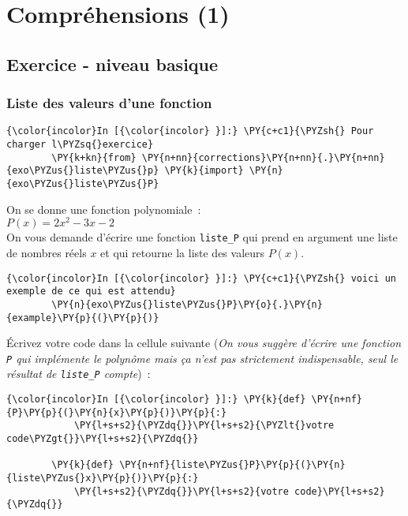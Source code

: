     \hypertarget{compruxe9hensions-1}{%
\section{Compréhensions (1)}\label{compruxe9hensions-1}}

    \hypertarget{exercice---niveau-basique}{%
\subsection{Exercice - niveau basique}\label{exercice---niveau-basique}}

    \hypertarget{liste-des-valeurs-dune-fonction}{%
\subsubsection{Liste des valeurs d'une
fonction}\label{liste-des-valeurs-dune-fonction}}

    \begin{Verbatim}[commandchars=\\\{\}]
{\color{incolor}In [{\color{incolor} }]:} \PY{c+c1}{\PYZsh{} Pour charger l\PYZsq{}exercice}
        \PY{k+kn}{from} \PY{n+nn}{corrections}\PY{n+nn}{.}\PY{n+nn}{exo\PYZus{}liste\PYZus{}p} \PY{k}{import} \PY{n}{exo\PYZus{}liste\PYZus{}P}
\end{Verbatim}


    On se donne une fonction polynomiale~:\\

\(P(x) = 2x^2 - 3x - 2\)\\

    On vous demande d'écrire une fonction \texttt{liste\_P} qui prend en
argument une liste de nombres réels \(x\) et qui retourne la liste des
valeurs \(P(x)\).

    \begin{Verbatim}[commandchars=\\\{\}]
{\color{incolor}In [{\color{incolor} }]:} \PY{c+c1}{\PYZsh{} voici un exemple de ce qui est attendu}
        \PY{n}{exo\PYZus{}liste\PYZus{}P}\PY{o}{.}\PY{n}{example}\PY{p}{(}\PY{p}{)}
\end{Verbatim}


    Écrivez votre code dans la cellule suivante (\emph{On vous suggère
d'écrire une fonction \texttt{P} qui implémente le polynôme mais ça
n'est pas strictement indispensable, seul le résultat de
\texttt{liste\_P} compte})~:

    \begin{Verbatim}[commandchars=\\\{\}]
{\color{incolor}In [{\color{incolor} }]:} \PY{k}{def} \PY{n+nf}{P}\PY{p}{(}\PY{n}{x}\PY{p}{)}\PY{p}{:}
            \PY{l+s+s2}{\PYZdq{}}\PY{l+s+s2}{\PYZlt{}votre code\PYZgt{}}\PY{l+s+s2}{\PYZdq{}}
        
        \PY{k}{def} \PY{n+nf}{liste\PYZus{}P}\PY{p}{(}\PY{n}{liste\PYZus{}x}\PY{p}{)}\PY{p}{:}
            \PY{l+s+s2}{\PYZdq{}}\PY{l+s+s2}{votre code}\PY{l+s+s2}{\PYZdq{}}
\end{Verbatim}


